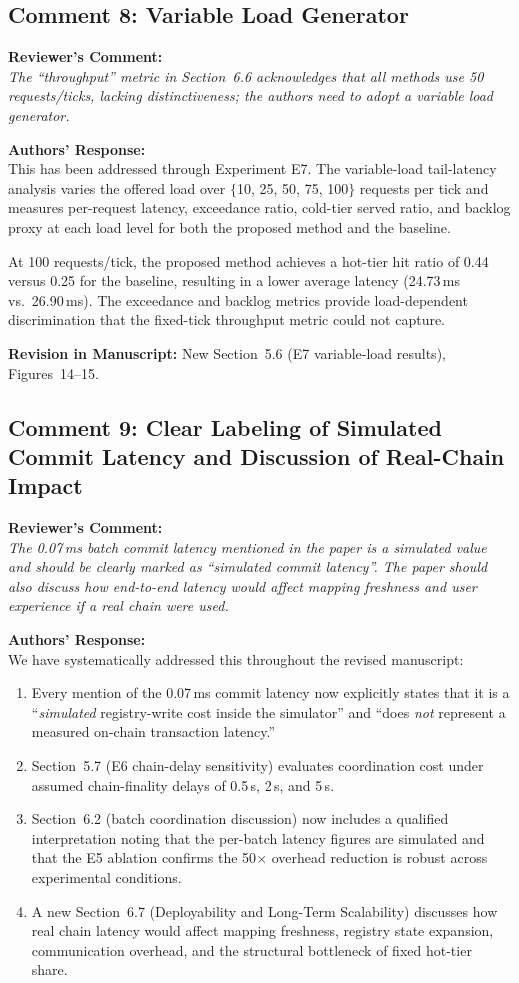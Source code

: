 \documentclass[11pt,a4paper]{article}
\newcommand{\reviewercomment}[1]{%
  \vspace{6pt}\noindent\textbf{\textcolor{reviewercolor}{Reviewer's Comment:}}\\
  \textcolor{reviewercolor}{\itshape #1}\vspace{4pt}}
\newcommand{\response}[1]{%
  \noindent\textbf{\textcolor{responsecolor}{Authors' Response:}}\\
  #1\vspace{8pt}}
\newcommand{\revision}[1]{%
  \noindent\textbf{Revision in Manuscript:} #1\vspace{4pt}}
\begin{document}
\subsection*{Comment 8: Variable Load Generator}

\reviewercomment{The ``throughput'' metric in Section~6.6 acknowledges that all methods use 50 requests/ticks, lacking distinctiveness; the authors need to adopt a variable load generator.}

\response{This has been addressed through Experiment E7. The variable-load tail-latency analysis varies the offered load over $\{$10, 25, 50, 75, 100$\}$ requests per tick and measures per-request latency, exceedance ratio, cold-tier served ratio, and backlog proxy at each load level for both the proposed method and the baseline.

At 100 requests/tick, the proposed method achieves a hot-tier hit ratio of 0.44 versus 0.25 for the baseline, resulting in a lower average latency (24.73\,ms vs.\ 26.90\,ms). The exceedance and backlog metrics provide load-dependent discrimination that the fixed-tick throughput metric could not capture.}

\revision{New Section~5.6 (E7 variable-load results), Figures~14--15.}

\subsection*{Comment 9: Clear Labeling of Simulated Commit Latency and Discussion of Real-Chain Impact}

\reviewercomment{The 0.07\,ms batch commit latency mentioned in the paper is a simulated value and should be clearly marked as ``simulated commit latency''. The paper should also discuss how end-to-end latency would affect mapping freshness and user experience if a real chain were used.}

\response{We have systematically addressed this throughout the revised manuscript:

\begin{enumerate}[nosep]
\item Every mention of the 0.07\,ms commit latency now explicitly states that it is a ``\emph{simulated} registry-write cost inside the simulator'' and ``does \emph{not} represent a measured on-chain transaction latency.''
\item Section~5.7 (E6 chain-delay sensitivity) evaluates coordination cost under assumed chain-finality delays of 0.5\,s, 2\,s, and 5\,s.
\item Section~6.2 (batch coordination discussion) now includes a qualified interpretation noting that the per-batch latency figures are simulated and that the E5 ablation confirms the 50$\times$ overhead reduction is robust across experimental conditions.
\item A new Section~6.7 (Deployability and Long-Term Scalability) discusses how real chain latency would affect mapping freshness, registry state expansion, communication overhead, and the structural bottleneck of fixed hot-tier share.
\end{enumerate}}
\end{document}

